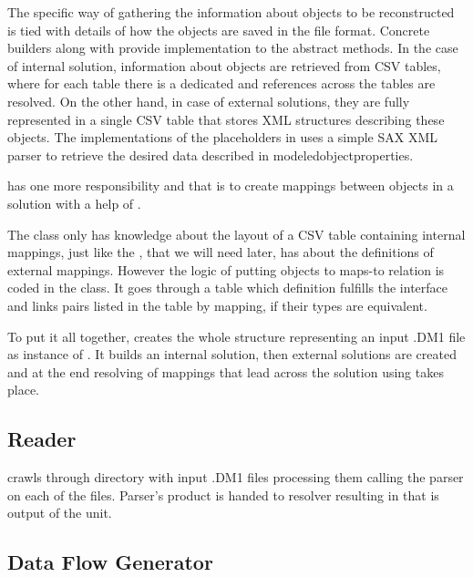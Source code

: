 The specific way of gathering the information about objects to be reconstructed is tied with details of how the objects are saved in the file format. Concrete builders 	 along with  provide implementation to the abstract methods.
In the case of internal solution, information about objects are retrieved from CSV tables, where for each table there is a dedicated and references across the tables are resolved.
On the other hand, in case of external solutions, they are fully represented in a single CSV table that stores XML structures describing these objects. The implementations of the placeholders in  uses a simple SAX XML parser to retrieve the desired data described in modeledobjectproperties.

 has one more responsibility and that is to create mappings between  objects in a solution with a help of . 

The   class only has knowledge about the layout of a CSV table containing internal mappings, just like the , that we will need later, has about the definitions of external mappings. However the logic of putting objects to maps-to relation is coded in the  class.
It goes through a table which definition fulfills the interface  and links pairs listed in the table by mapping, if their types are equivalent.

To put it all together,  creates the whole structure representing an input .DM1 file as instance of . It builds an internal solution, then external solutions are created and at the end resolving of mappings that lead across the solution using  takes place.


\subsection{Reader}

 crawls through directory with input .DM1 files processing them calling the parser on each of the files. Parser's product is handed to resolver resulting in  that is output of the unit.

\subsection{Data Flow Generator}


